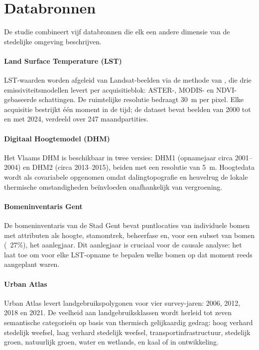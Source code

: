 \section{Databronnen}
\label{sec:databronnen}

De studie combineert vijf databronnen die elk een andere dimensie van de stedelijke omgeving beschrijven.

\paragraph{Land Surface Temperature (LST)}
LST-waarden worden afgeleid van Landsat-beelden via de methode van \textcite{Parastatidis2017}, die drie emissiviteitsmodellen levert per acquisitieblok: ASTER-, MODIS- en NDVI-gebaseerde schattingen.
De ruimtelijke resolutie bedraagt 30~m per pixel.
Elke acquisitie bestrijkt één moment in de tijd; de dataset bevat beelden van 2000 tot en met 2024, verdeeld over 247 maandpartities.

\paragraph{Digitaal Hoogtemodel (DHM)}
Het Vlaams DHM is beschikbaar in twee versies: DHM1 (opnamejaar circa 2001--2004) en DHM2 (circa 2013--2015), beiden met een resolutie van 5~m.
Hoogtedata wordt als covariabele opgenomen omdat dalingtopografie en heuvelrug de lokale thermische omstandigheden beïnvloeden onafhankelijk van vergroening.

\paragraph{Bomeninventaris Gent}
De bomeninventaris van de Stad Gent \autocite{StadGentBomen} bevat puntlocaties van individuele bomen met attributen als hoogte, stamomtrek, beheerfase en, voor een subset van bomen (~27\%), het aanlegjaar.
Dit aanlegjaar is cruciaal voor de causale analyse: het laat toe om voor elke LST-opname te bepalen welke bomen op dat moment reeds aangeplant waren.

\paragraph{Urban Atlas}
Urban Atlas \autocite{EEA2020} levert landgebruikspolygonen voor vier survey-jaren: 2006, 2012, 2018 en 2021.
De veelheid aan landgebruiksklassen wordt herleid tot zeven semantische categorieën op basis van thermisch gelijkaardig gedrag: hoog verhard stedelijk weefsel, laag verhard stedelijk weefsel, transportinfrastructuur, stedelijk groen, natuurlijk groen, water en wetlands, en kaal of in ontwikkeling.

